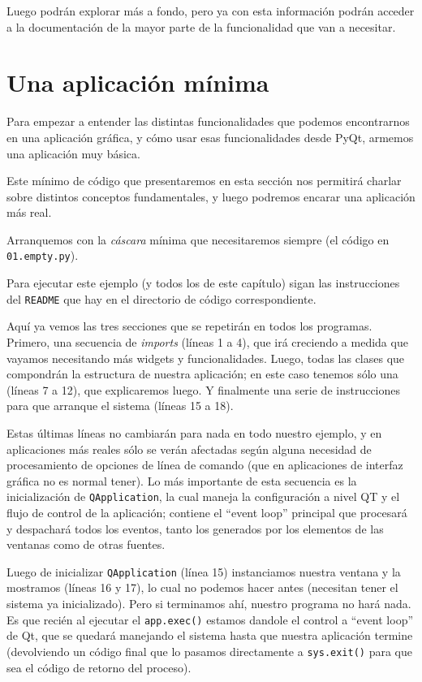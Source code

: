 Luego podrán explorar más a fondo, pero ya con esta información podrán acceder a la documentación de la mayor parte de la funcionalidad que van a necesitar.


\section{Una aplicación mínima}

Para empezar a entender las distintas funcionalidades que podemos encontrarnos en una aplicación gráfica, y cómo usar esas funcionalidades desde PyQt, armemos una aplicación muy básica.

Este mínimo de código que presentaremos en esta sección nos permitirá charlar sobre distintos conceptos fundamentales, y luego podremos encarar una aplicación más real.

Arranquemos con la \textit{cáscara} mínima que necesitaremos siempre (el código en \texttt{01.empty.py}).


\begin{info}
Para ejecutar este ejemplo (y todos los de este capítulo) sigan las instrucciones del \texttt{README} que hay en el directorio de código correspondiente.
\end{info}

Aquí ya vemos las tres secciones que se repetirán en todos los programas. Primero, una secuencia de \textit{imports} (líneas 1 a 4), que irá creciendo a medida que vayamos necesitando más widgets y funcionalidades. Luego, todas las clases que compondrán la estructura de nuestra aplicación; en este caso tenemos sólo una (líneas 7 a 12), que explicaremos luego. Y finalmente una serie de instrucciones para que arranque el sistema (líneas 15 a 18).

Estas últimas líneas no cambiarán para nada en todo nuestro ejemplo, y en aplicaciones más reales sólo se verán afectadas según alguna necesidad de procesamiento de opciones de línea de comando (que en aplicaciones de interfaz gráfica no es normal tener). Lo más importante de esta secuencia es la inicialización de \texttt{QApplication}, la cual maneja la configuración a nivel QT y el flujo de control de la aplicación; contiene el ``event loop'' principal que procesará y despachará todos los eventos, tanto los generados por los elementos de las ventanas como de otras fuentes.

Luego de inicializar \texttt{QApplication} (línea 15) instanciamos nuestra ventana y la mostramos (líneas 16 y 17), lo cual no podemos hacer antes (necesitan tener el sistema ya inicializado). Pero si terminamos ahí, nuestro programa no hará nada. Es que recién al ejecutar el \texttt{app.exec()} estamos dandole el control a ``event loop'' de Qt, que se quedará manejando el sistema hasta que nuestra aplicación termine (devolviendo un código final que lo pasamos directamente a \texttt{sys.exit()} para que sea el código de retorno del proceso).

